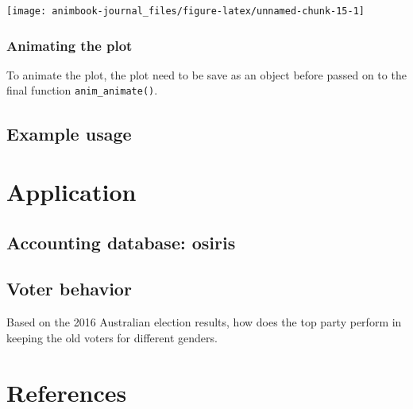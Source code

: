 \texttt{[image: animbook-journal\_files/figure-latex/unnamed-chunk-15-1]}

\hypertarget{animating-the-plot}{%
\subsubsection{Animating the plot}\label{animating-the-plot}}

To animate the plot, the plot need to be save as an object before passed on to the final function \texttt{anim\_animate()}.

\hypertarget{example-usage}{%
\subsection{Example usage}\label{example-usage}}

\hypertarget{application}{%
\section{Application}\label{application}}

\hypertarget{accounting-database-osiris}{%
\subsection{Accounting database: osiris}\label{accounting-database-osiris}}

\hypertarget{voter-behavior}{%
\subsection{Voter behavior}\label{voter-behavior}}

Based on the 2016 Australian election results, how does the top party perform in keeping the old voters for different genders.

\hypertarget{references}{%
\section*{References}\label{references}}

